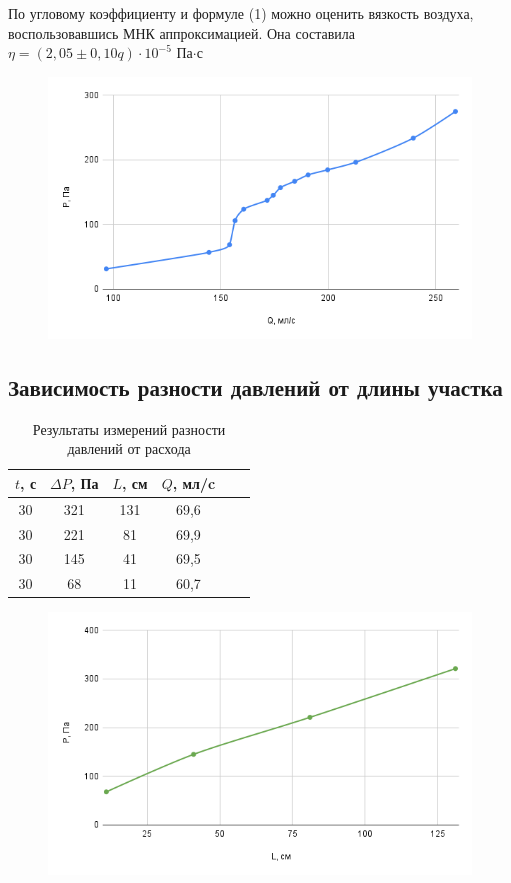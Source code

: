 \documentclass[a4paper, 12pt]{article}
\begin{document}
По угловому коэффициенту и формуле (1) можно оценить вязкость воздуха, воспользовавшись МНК аппроксимацией. Она составила 
$\eta = (2,05 \pm 0,10q) \cdot 10^{-5}$ Па$\cdot$с

\begin{figure}[H]
    \centering
    \includegraphics[scale=0.7]{chart2.png}
\end{figure}

\begin{center}
\subsection*{Зависимость разности давлений от длины участка}    
\end{center}

\begin{table}[h]
    \centering
    \begin{tabular}{|c|c|c|c|c|c|}
        \hline $ t$, с & $\Delta P$, Па & $L$, см & $Q$, мл/c\\
        \hline  30 & 321 & 131 & 69,6 \\
        \hline  30 & 221 & 81 & 69,9\\
        \hline 30 & 145 & 41  & 69,5\\
        \hline 30 & 68 & 11   & 60,7\\\hline       
    \end{tabular}
    \caption{Результаты измерений разности давлений от расхода}
    \label{p12}
\end{table}

\begin{figure}[H]
    \centering
    \includegraphics[scale=0.7]{chart3.png}
\end{figure}
\end{document}
